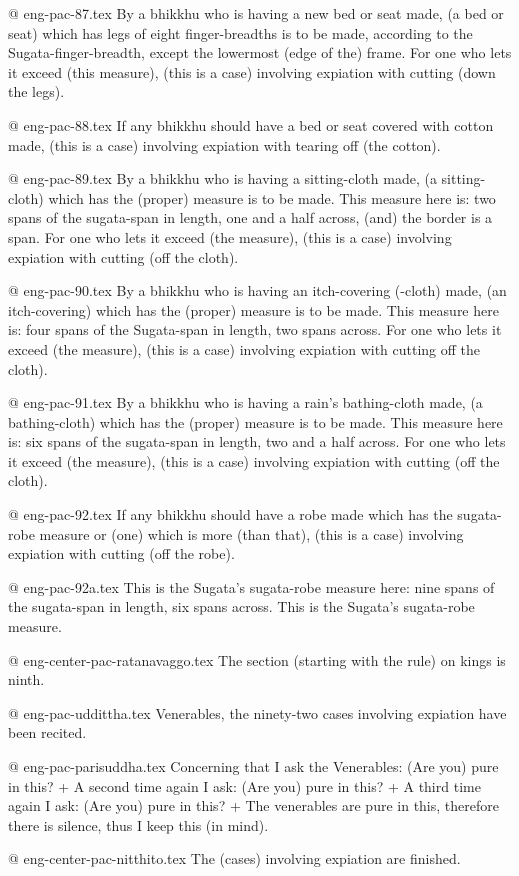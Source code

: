 @ eng-pac-87.tex
By a bhikkhu who is having a new bed or seat made, (a bed or seat) which has legs of eight finger-breadths is to be made, according to the Sugata-finger-breadth, except the lowermost (edge of the) frame. For one who lets it exceed (this measure), (this is a case) involving expiation with cutting (down the legs).

@ eng-pac-88.tex
If any bhikkhu should have a bed or seat covered with cotton made, (this is a case) involving expiation with tearing off (the cotton).

@ eng-pac-89.tex
By a bhikkhu who is having a sitting-cloth made, (a sitting-cloth) which has the (proper) measure is to be made. This measure here is: two spans of the sugata-span in length, one and a half across, (and) the border is a span. For one who lets it exceed (the measure), (this is a case) involving expiation with cutting (off the cloth).

@ eng-pac-90.tex
By a bhikkhu who is having an itch-covering (-cloth) made, (an itch-covering) which has the (proper) measure is to be made. This measure here is: four spans of the Sugata-span in length, two spans across. For one who lets it exceed (the measure), (this is a case) involving expiation with cutting off the cloth).

@ eng-pac-91.tex
By a bhikkhu who is having a rain's bathing-cloth made, (a bathing-cloth) which has the (proper) measure is to be made. This measure here is: six spans of the sugata-span in length, two and a half across. For one who lets it exceed (the measure), (this is a case) involving expiation with cutting (off the cloth).

@ eng-pac-92.tex
If any bhikkhu should have a robe made which has the sugata-robe measure or (one) which is more (than that), (this is a case) involving expiation with cutting (off the robe).

@ eng-pac-92a.tex
This is the Sugata's sugata-robe measure here: nine spans of the sugata-span in length, six spans across. This is the Sugata's sugata-robe measure.

@ eng-center-pac-ratanavaggo.tex
The section (starting with the rule) on kings is ninth.

@ eng-pac-uddittha.tex
Venerables, the ninety-two cases involving expiation have been recited.

@ eng-pac-parisuddha.tex
Concerning that I ask the Venerables: (Are you) pure in this? +
A second time again I ask: (Are you) pure in this? +
A third time again I ask: (Are you) pure in this? +
The venerables are pure in this, therefore there is silence, thus I keep this (in mind).

@ eng-center-pac-nitthito.tex
The (cases) involving expiation are finished.
